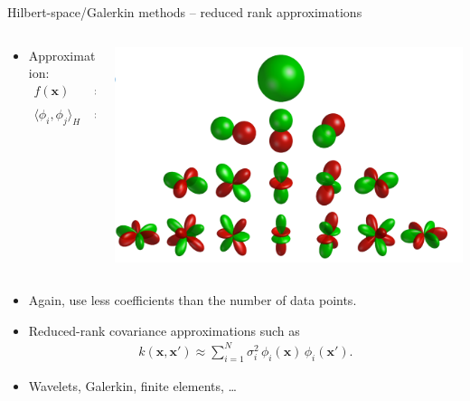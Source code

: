 \documentclass[first=dgreen,second=purple,presentation]{elecslides}
\begin{document}
\begin{frame}{Hilbert-space/Galerkin methods -- reduced rank approximations}

\begin{block}{}
\begin{columns}
\begin{column}{0.5\textwidth}
\begin{itemize}[<+->]
\item Approximation:
{\small
\begin{equation}
\begin{split}
  f(\mathbf{x}) &\approx \sum_{i}
    c_i \, \phi_i(\mathbf{x}) \\
    \langle \phi_i, \phi_j \rangle_H &\approx \delta_{ij},  \text{ e.g. } \nabla^2 \phi_i = -\lambda_i \, \phi_i
\end{split}
\nonumber
\end{equation}
}
\end{itemize}
\end{column}
\begin{column}{0.4\textwidth}
\includegraphics[width=1.0\columnwidth]{spherical}
\end{column}
\end{columns}
\end{block}

\begin{itemize}[<+->]
\setcounter{enumi}{2}
\item Again, use \alert{less coefficients} than the \alert{number of data points}.
\item \alert{Reduced-rank covariance approximations} such as
\begin{equation}
\begin{split}
  k(\mathbf{x},\mathbf{x}') \approx \sum_{i=1}^N  
    \sigma^2_i \, \phi_i(\mathbf{x}) \, \phi_i(\mathbf{x}').
\end{split}
\nonumber
\end{equation}
\item Wavelets, Galerkin, finite elements, \ldots
\end{itemize}

\end{frame}
\end{document}

